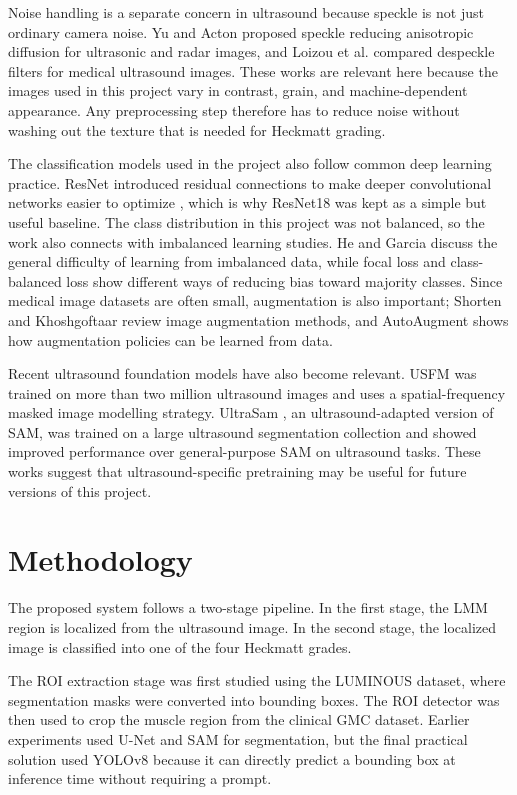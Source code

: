 \documentclass[twocolumn,10pt]{article}
\begin{document}
Noise handling is a separate concern in ultrasound because speckle is not just ordinary camera noise. Yu and Acton \cite{YuActon2002} proposed speckle reducing anisotropic diffusion for ultrasonic and radar images, and Loizou et al. \cite{Loizou2005} compared despeckle filters for medical ultrasound images. These works are relevant here because the images used in this project vary in contrast, grain, and machine-dependent appearance. Any preprocessing step therefore has to reduce noise without washing out the texture that is needed for Heckmatt grading.

The classification models used in the project also follow common deep learning practice. ResNet introduced residual connections to make deeper convolutional networks easier to optimize \cite{he2016resnet}, which is why ResNet18 was kept as a simple but useful baseline. The class distribution in this project was not balanced, so the work also connects with imbalanced learning studies. He and Garcia \cite{HeGarcia2009} discuss the general difficulty of learning from imbalanced data, while focal loss \cite{LinFocal2017} and class-balanced loss \cite{Cui2019} show different ways of reducing bias toward majority classes. Since medical image datasets are often small, augmentation is also important; Shorten and Khoshgoftaar \cite{Shorten2019} review image augmentation methods, and AutoAugment \cite{Cubuk2019} shows how augmentation policies can be learned from data.

Recent ultrasound foundation models have also become relevant. USFM \cite{JIAO2024103202} was trained on more than two million ultrasound images and uses a spatial-frequency masked image modelling strategy. UltraSam \cite{meyer2024ultrasam}, an ultrasound-adapted version of SAM, was trained on a large ultrasound segmentation collection and showed improved performance over general-purpose SAM on ultrasound tasks. These works suggest that ultrasound-specific pretraining may be useful for future versions of this project.

\section{Methodology}
\label{methodology}
The proposed system follows a two-stage pipeline. In the first stage, the LMM region is localized from the ultrasound image. In the second stage, the localized image is classified into one of the four Heckmatt grades.

The ROI extraction stage was first studied using the LUMINOUS dataset, where segmentation masks were converted into bounding boxes. The ROI detector was then used to crop the muscle region from the clinical GMC dataset. Earlier experiments used U-Net and SAM for segmentation, but the final practical solution used YOLOv8 because it can directly predict a bounding box at inference time without requiring a prompt.
\end{document}
